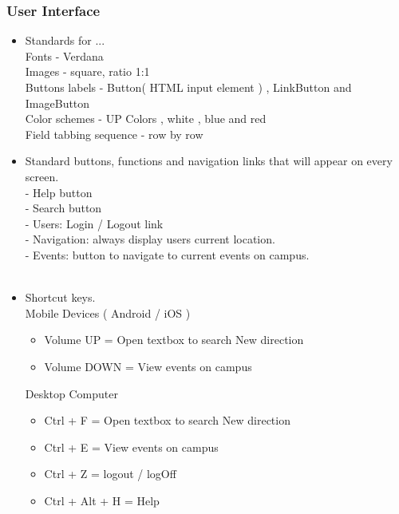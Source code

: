 \documentclass[a4paper,12pt]{report}
\begin{document}
	\subsubsection{User Interface}
		\begin{itemize}
			\item Standards for ...\\
			
			Fonts -  Verdana \\
			Images - square, ratio 1:1 \\
			Buttons labels - Button( HTML input element ) , LinkButton and ImageButton \\
			Color schemes - UP Colors , white , blue and red \\
			Field tabbing sequence - row by row \\
			
			\item Standard buttons, functions and navigation links that will
			appear on every screen. \\
			
				- Help button \\
				- Search button \\
				- Users: Login / Logout link \\
				- Navigation: always display users current location. \\
				- Events: button to navigate to current events on campus. \\\\
				
			\item Shortcut keys.\\
			
				Mobile Devices ( Android / iOS )  
				\begin{itemize}
					\item Volume UP = Open textbox to search New direction
					\item Volume DOWN = View events on campus 
				\end{itemize}
				    
				Desktop Computer
				\begin{itemize}
					\item Ctrl + F = Open textbox to search New direction
					\item Ctrl + E = View events on campus 
					\item Ctrl + Z = logout / logOff
					\item Ctrl + Alt + H = Help
	
				\end{itemize}
				

\end{itemize}
\end{document}
